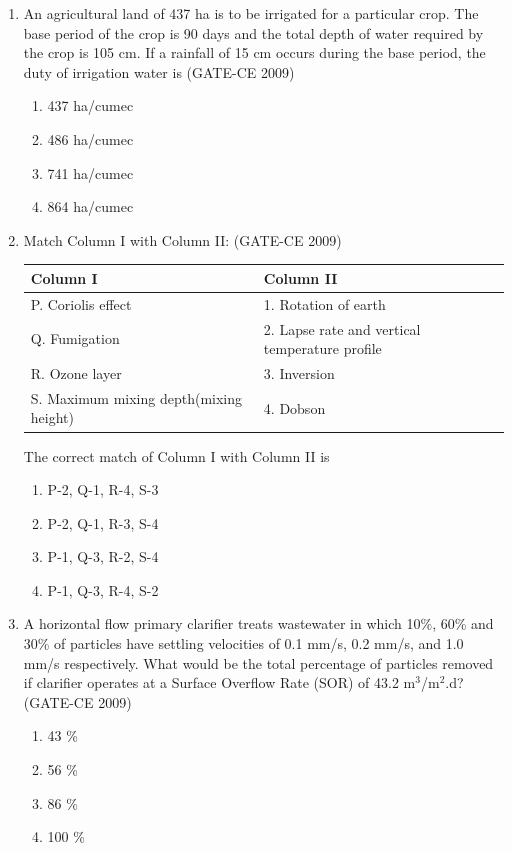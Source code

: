 \documentclass[journal,12pt,onecolumn]{article}
\theoremstyle{remark}
\begin{document}
\begin{enumerate}
    \item An agricultural land of 437 ha is to be irrigated for a particular crop. The base period of the crop is 90 days and the total depth of water required by the crop is 105 cm. If a rainfall of 15 cm occurs during the base period, the duty of irrigation water is (GATE-CE 2009)
    \begin{enumerate}
        \item 437 ha/cumec 
        \item 486 ha/cumec 
        \item 741 ha/cumec 
        \item 864 ha/cumec
    \end{enumerate}
    

    \item Match Column I with Column II: (GATE-CE 2009)
    \begin{center}
    \begin{tabular}{|l|l|}
    \hline
    \textbf{Column I} & \textbf{Column II} \\
    \hline
    P. Coriolis effect & 1. Rotation of earth \\
    Q. Fumigation & 2. Lapse rate and vertical temperature profile \\
    R. Ozone layer & 3. Inversion \\
    S. Maximum mixing depth(mixing height) & 4. Dobson \\
    \hline
    \end{tabular}
    \end{center}
    The correct match of Column I with Column II is
    \begin{enumerate}
        \item P-2, Q-1, R-4, S-3 
        \item P-2, Q-1, R-3, S-4 
        \item P-1, Q-3, R-2, S-4 
        \item P-1, Q-3, R-4, S-2
    \end{enumerate}
    
    \item A horizontal flow primary clarifier treats wastewater in which 10\%, 60\% and 30\% of particles have settling velocities of 0.1 mm/s, 0.2 mm/s, and 1.0 mm/s respectively. What would be the total percentage of particles removed if clarifier operates at a Surface Overflow Rate (SOR) of 43.2 m$^3$/m$^2$.d? (GATE-CE 2009)
    \begin{enumerate}
        \item 43 \% 
        \item 56 \% 
        \item 86 \% 
        \item 100 \%
    \end{enumerate}
    

\end{enumerate}
\end{document}
